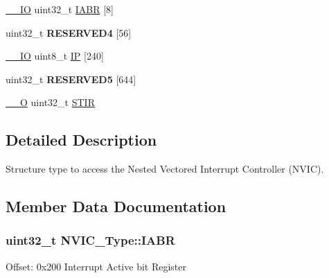 \begin{DoxyCompactItemize}
\item 
\hyperlink{group___c_m_s_i_s__core__definitions_gaec43007d9998a0a0e01faede4133d6be}{\-\_\-\-\_\-\-I\-O} uint32\-\_\-t \hyperlink{struct_n_v_i_c___type_ac86c5bac0af593beb8004ab0ff9097bc}{I\-A\-B\-R} \mbox{[}8\mbox{]}
\item 
\hypertarget{struct_n_v_i_c___type_a8e4a797aa0743ebeba14962c77d2e7ab}{uint32\-\_\-t {\bfseries R\-E\-S\-E\-R\-V\-E\-D4} \mbox{[}56\mbox{]}}\label{struct_n_v_i_c___type_a8e4a797aa0743ebeba14962c77d2e7ab}

\item 
\hyperlink{group___c_m_s_i_s__core__definitions_gaec43007d9998a0a0e01faede4133d6be}{\-\_\-\-\_\-\-I\-O} uint8\-\_\-t \hyperlink{struct_n_v_i_c___type_a3ca7b7ff6aa6094772e524887739bf37}{I\-P} \mbox{[}240\mbox{]}
\item 
\hypertarget{struct_n_v_i_c___type_ad0598b9cd851203ff328a9c7c347f1b6}{uint32\-\_\-t {\bfseries R\-E\-S\-E\-R\-V\-E\-D5} \mbox{[}644\mbox{]}}\label{struct_n_v_i_c___type_ad0598b9cd851203ff328a9c7c347f1b6}

\item 
\hyperlink{group___c_m_s_i_s__core__definitions_ga7e25d9380f9ef903923964322e71f2f6}{\-\_\-\-\_\-\-O} uint32\-\_\-t \hyperlink{struct_n_v_i_c___type_a0b0d7f3131da89c659a2580249432749}{S\-T\-I\-R}
\end{DoxyCompactItemize}


\subsection{Detailed Description}
Structure type to access the Nested Vectored Interrupt Controller (N\-V\-I\-C). 

\subsection{Member Data Documentation}
\hypertarget{struct_n_v_i_c___type_ac86c5bac0af593beb8004ab0ff9097bc}{
\subsubsection[{I\-A\-B\-R}]{ uint32\-\_\-t N\-V\-I\-C\-\_\-\-Type\-::\-I\-A\-B\-R}}\label{struct_n_v_i_c___type_ac86c5bac0af593beb8004ab0ff9097bc}
Offset\-: 0x200 Interrupt Active bit Register

